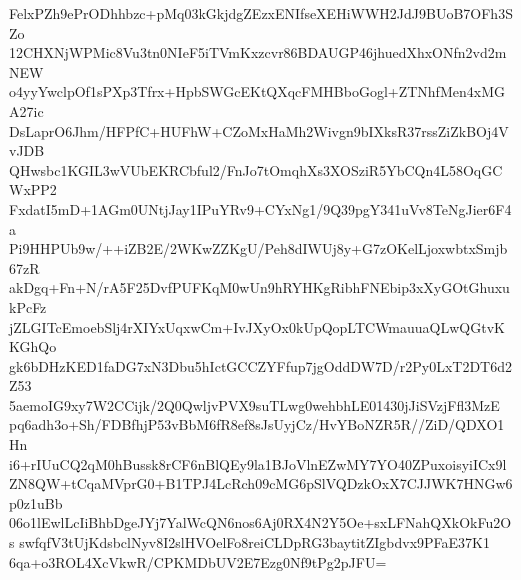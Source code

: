 FelxPZh9ePrODhhbzc+pMq03kGkjdgZEzxENIfseXEHiWWH2JdJ9BUoB7OFh3SZo
12CHXNjWPMic8Vu3tn0NIeF5iTVmKxzcvr86BDAUGP46jhuedXhxONfn2vd2mNEW
o4yyYwclpOf1sPXp3Tfrx+HpbSWGcEKtQXqcFMHBboGogl+ZTNhfMen4xMGA27ic
DsLaprO6Jhm/HFPfC+HUFhW+CZoMxHaMh2Wivgn9bIXksR37rssZiZkBOj4VvJDB
QHwsbc1KGIL3wVUbEKRCbful2/FnJo7tOmqhXs3XOSziR5YbCQn4L58OqGCWxPP2
FxdatI5mD+1AGm0UNtjJay1IPuYRv9+CYxNg1/9Q39pgY341uVv8TeNgJier6F4a
Pi9HHPUb9w/++iZB2E/2WKwZZKgU/Peh8dIWUj8y+G7zOKelLjoxwbtxSmjb67zR
akDgq+Fn+N/rA5F25DvfPUFKqM0wUn9hRYHKgRibhFNEbip3xXyGOtGhuxukPcFz
jZLGITcEmoebSlj4rXIYxUqxwCm+IvJXyOx0kUpQopLTCWmauuaQLwQGtvKKGhQo
gk6bDHzKED1faDG7xN3Dbu5hIctGCCZYFfup7jgOddDW7D/r2Py0LxT2DT6d2Z53
5aemoIG9xy7W2CCijk/2Q0QwljvPVX9suTLwg0wehbhLE01430jJiSVzjFfl3MzE
pq6adh3o+Sh/FDBfhjP53vBbM6fR8ef8sJsUyjCz/HvYBoNZR5R//ZiD/QDXO1Hn
i6+rIUuCQ2qM0hBussk8rCF6nBlQEy9la1BJoVlnEZwMY7YO40ZPuxoisyiICx9l
ZN8QW+tCqaMVprG0+B1TPJ4LcRch09cMG6pSlVQDzkOxX7CJJWK7HNGw6p0z1uBb
06o1lEwlLcIiBhbDgeJYj7YalWcQN6nos6Aj0RX4N2Y5Oe+sxLFNahQXkOkFu2Os
swfqfV3tUjKdsbclNyv8I2slHVOelFo8reiCLDpRG3baytitZIgbdvx9PFaE37K1
6qa+o3ROL4XcVkwR/CPKMDbUV2E7Ezg0Nf9tPg2pJFU=
